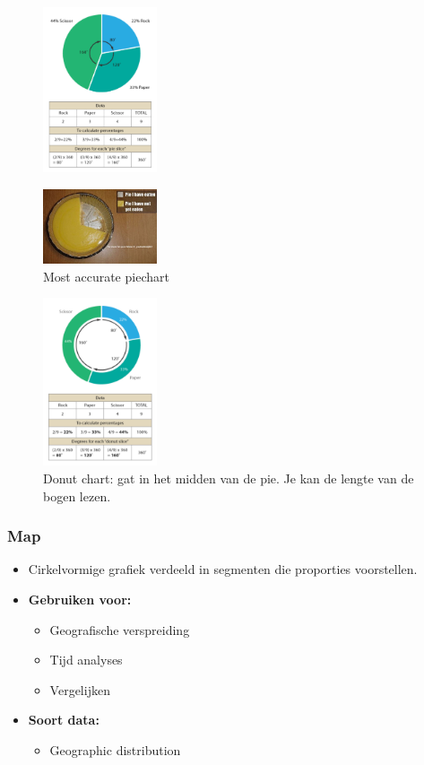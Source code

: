 \documentclass{article}
\newcommand{\bold}[1]{\textbf{#1}}
\begin{document}
\begin{figure}[H]
    \centering
    \includegraphics[width=0.3\textwidth]{dv-piechart1.png}
    \caption{}
\end{figure}
\begin{figure}[H]
    \centering
    \includegraphics[width=0.3\textwidth]{dv-piechart2.png}
    \caption{Most accurate piechart}
\end{figure}
\begin{figure}[H]
    \centering
    \includegraphics[width=0.3\textwidth]{dv-piechart3.png}
    \caption{Donut chart: gat in het midden van de pie. Je kan de lengte van de bogen lezen.}
\end{figure}

\subsubsection{Map}

\begin{itemize}
    \item Cirkelvormige grafiek verdeeld in segmenten die proporties voorstellen.
    \item \bold{Gebruiken voor:}
    \begin{itemize}
        \item Geografische verspreiding
        \item Tijd analyses
        \item Vergelijken
    \end{itemize}
    \item \bold{Soort data:}
    \begin{itemize}
        \item Geographic distribution
    \end{itemize}
\end{itemize}
\end{document}
